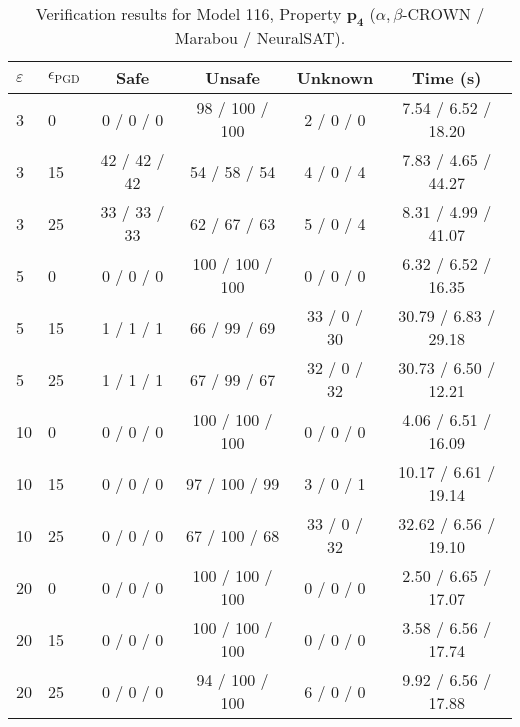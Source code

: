 \begin{table}[htbp]\centering
\caption{\small Verification results for Model 116, Property $\mathbf{p_{4}}$ ($\alpha,\beta$-CROWN / Marabou / NeuralSAT).}
\label{tab:model116_p4}
\begin{tabular}{llcccc}
\toprule
$\varepsilon$ & $\epsilon_{\scriptscriptstyle\mathrm{PGD}}$ & Safe & Unsafe & Unknown & Time (s) \\
\midrule
3 & 0 & 0 / 0 / 0 & 98 / 100 / 100 & 2 / 0 / 0 & 7.54 / 6.52 / 18.20 \\
3 & 15 & 42 / 42 / 42 & 54 / 58 / 54 & 4 / 0 / 4 & 7.83 / 4.65 / 44.27 \\
3 & 25 & 33 / 33 / 33 & 62 / 67 / 63 & 5 / 0 / 4 & 8.31 / 4.99 / 41.07 \\
5 & 0 & 0 / 0 / 0 & 100 / 100 / 100 & 0 / 0 / 0 & 6.32 / 6.52 / 16.35 \\
5 & 15 & 1 / 1 / 1 & 66 / 99 / 69 & 33 / 0 / 30 & 30.79 / 6.83 / 29.18 \\
5 & 25 & 1 / 1 / 1 & 67 / 99 / 67 & 32 / 0 / 32 & 30.73 / 6.50 / 12.21 \\
10 & 0 & 0 / 0 / 0 & 100 / 100 / 100 & 0 / 0 / 0 & 4.06 / 6.51 / 16.09 \\
10 & 15 & 0 / 0 / 0 & 97 / 100 / 99 & 3 / 0 / 1 & 10.17 / 6.61 / 19.14 \\
10 & 25 & 0 / 0 / 0 & 67 / 100 / 68 & 33 / 0 / 32 & 32.62 / 6.56 / 19.10 \\
20 & 0 & 0 / 0 / 0 & 100 / 100 / 100 & 0 / 0 / 0 & 2.50 / 6.65 / 17.07 \\
20 & 15 & 0 / 0 / 0 & 100 / 100 / 100 & 0 / 0 / 0 & 3.58 / 6.56 / 17.74 \\
20 & 25 & 0 / 0 / 0 & 94 / 100 / 100 & 6 / 0 / 0 & 9.92 / 6.56 / 17.88 \\
\bottomrule
\end{tabular}
\end{table}
